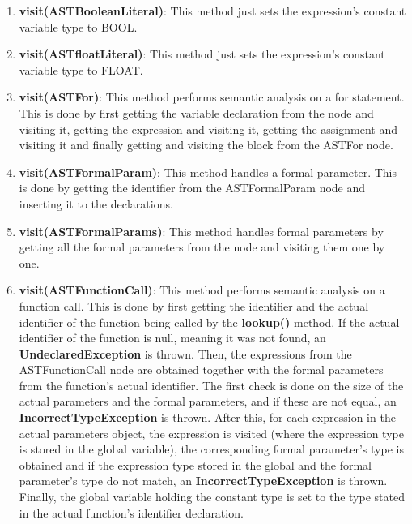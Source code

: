 \documentclass{article}
\begin{document}
\begin{enumerate}
					\item \textbf{visit(ASTBooleanLiteral)}: This method just sets the expression's constant variable type to BOOL.
			
					\item \textbf{visit(ASTfloatLiteral)}: This method just sets the expression's constant variable type to FLOAT.
					
					\item \textbf{visit(ASTFor)}:  This method performs semantic analysis on a for statement. This is done by first getting the variable declaration from the node and visiting it, getting the expression and visiting it, getting the assignment and visiting it and finally getting and visiting the block from the ASTFor node. 
			
					\item \textbf{visit(ASTFormalParam)}: This method handles a formal parameter. This is done by getting the identifier from the ASTFormalParam node and inserting it to the declarations.
					
					\item \textbf{visit(ASTFormalParams)}: This method handles formal parameters by getting all the formal parameters from the node and visiting them one by one.
			
					\item \textbf{visit(ASTFunctionCall)}: This method performs semantic analysis on a function call. This is done by first getting the identifier and the actual identifier of the function being called by the \textbf{lookup()} method.  If the actual identifier of the function is null, meaning it was not found, an \textbf{UndeclaredException} is thrown. Then, the expressions from the ASTFunctionCall node are obtained together with the formal parameters from the function's actual identifier. The first check is done on the size of the actual parameters and the formal parameters, and if these are not equal, an \textbf{IncorrectTypeException} is thrown. After this, for each expression in the actual parameters object, the expression is visited (where the expression type is stored in the global variable), the corresponding formal parameter's type is obtained and if the expression type stored in the global and the formal parameter's type do not match, an \textbf{IncorrectTypeException} is thrown. Finally, the global variable holding the constant type is set to the type stated in the actual function's identifier declaration.
				

\end{enumerate}
\end{document}
